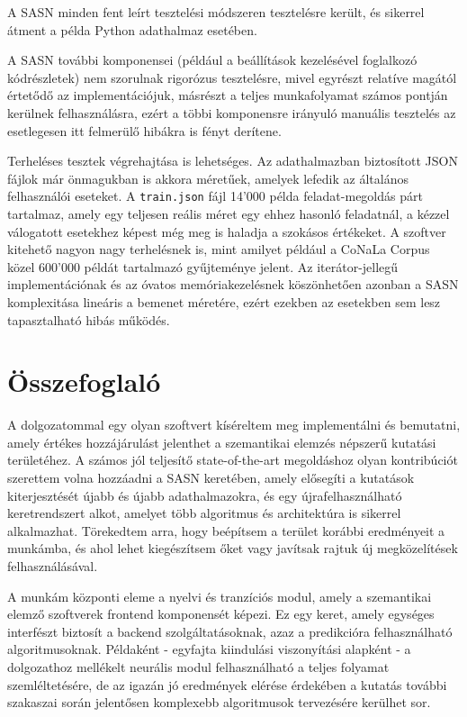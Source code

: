 \documentclass[twoside, 12pt]{report}
\begin{document}
A SASN minden fent leírt tesztelési módszeren tesztelésre került, és sikerrel átment a példa Python adathalmaz esetében.

A SASN további komponensei (például a beállítások kezelésével foglalkozó kódrészletek) nem szorulnak rigorózus tesztelésre, mivel egyrészt relatíve magától értetődő az implementációjuk, másrészt a teljes munkafolyamat számos pontján kerülnek felhasználásra, ezért a többi komponensre irányuló manuális tesztelés az esetlegesen itt felmerülő hibákra is fényt derítene.

Terheléses tesztek végrehajtása is lehetséges. Az adathalmazban biztosított JSON fájlok már önmagukban is akkora méretűek, amelyek lefedik az általános felhasználói eseteket. A \verb|train.json| fájl 14'000 példa feladat-megoldás párt tartalmaz, amely egy teljesen reális méret egy ehhez hasonló feladatnál, a kézzel válogatott esetekhez képest még meg is haladja a szokásos értékeket. A szoftver kitehető nagyon nagy terhelésnek is, mint amilyet például a CoNaLa Corpus \parencite{Yin+18a} közel 600'000 példát tartalmazó gyűjteménye jelent. Az iterátor-jellegű implementációnak és az óvatos memóriakezelésnek köszönhetően azonban a SASN komplexitása lineáris a bemenet méretére, ezért ezekben az esetekben sem lesz tapasztalható hibás működés.

\chapter{Összefoglaló}

A dolgozatommal egy olyan szoftvert kíséreltem meg implementálni és bemutatni, amely értékes hozzájárulást jelenthet a szemantikai elemzés népszerű kutatási területéhez. A számos jól teljesítő state-of-the-art megoldáshoz olyan kontribúciót szerettem volna hozzáadni a SASN keretében, amely elősegíti a kutatások kiterjesztését újabb és újabb adathalmazokra, és egy újrafelhasználható keretrendszert alkot, amelyet több algoritmus és architektúra is sikerrel alkalmazhat. Törekedtem arra, hogy beépítsem a terület korábbi eredményeit a munkámba, és ahol lehet kiegészítsem őket vagy javítsak rajtuk új megközelítések felhasználásával.

A munkám központi eleme a nyelvi és tranzíciós modul, amely a szemantikai elemző szoftverek frontend komponensét képezi. Ez egy keret, amely egységes interfészt biztosít a backend szolgáltatásoknak, azaz a predikcióra felhasználható algoritmusoknak. Példaként - egyfajta kiindulási viszonyítási alapként - a dolgozathoz mellékelt neurális modul felhasználható a teljes folyamat szemléltetésére, de az igazán jó eredmények elérése érdekében a kutatás további szakaszai során jelentősen komplexebb algoritmusok tervezésére kerülhet sor.
\end{document}

